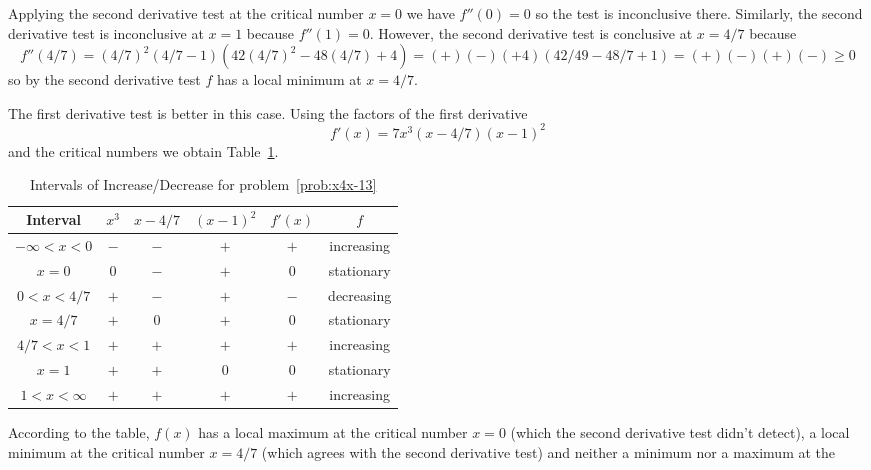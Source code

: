 \documentclass{article}
\begin{document}
\begin{enumerate}
  Applying the second derivative test at the critical number $x=0$ we
  have $f''(0)=0$ so the test is inconclusive there.  Similarly, the
  second derivative test is inconclusive at $x=1$ because $f''(1)=0$.
  However, the second derivative test is conclusive at $x=4/7$ because
  \begin{equation*}
    f''(4/7) = (4/7)^2(4/7-1) (42(4/7)^2-48(4/7)+4) = (+)(-)(+4)(42/49 - 48/7+1)
    = (+)(-)(+)(-) \ge 0
  \end{equation*}
  so by the second derivative test $f$ has a local minimum at $x=4/7$.

  The first derivative test is better in this case.  Using the factors
  of the first derivative
  \begin{equation*}
    f'(x)= 7x^3(x-4/7)(x-1)^2
  \end{equation*}
  and the critical numbers we obtain Table~\ref{tab:x4x-13fp}.
  \begin{table}[htbp]
    \centering
    \begin{tabular}{|c|c|c|c|c|c|}
      \hline
      Interval      & $x^3$ & $x-4/7$ & $(x-1)^2$ & $f'(x)$ & $f$
      \\
      \hline\hline
      $-\infty<x<0$ & $-$   & $-$     & $+$       & $+$     & increasing
      \\
      \hline
      $x=0$         & $0$   & $-$     & $+$       & $0$     & stationary
      \\
      \hline
      $0<x<4/7$     & $+$   & $-$     & $+$       & $-$     & decreasing
      \\
      \hline
      $x=4/7$       & $+$   & $0$     & $+$       & $0$     & stationary
      \\
      \hline
      $4/7<x<1$     & $+$   & $+$     & $+$       & $+$     & increasing
      \\
      \hline
      $x=1$         & $+$   & $+$     & $0$       & $0$     & stationary
      \\
      \hline
      $1<x<\infty$  & $+$   & $+$     & $+$       & $+$     & increasing
      \\
      \hline
    \end{tabular}
    \caption{Intervals of Increase/Decrease for problem~\ref{prob:x4x-13}}
    \label{tab:x4x-13fp}
  \end{table}
  According to the table, $f(x)$ has a local maximum at the critical
  number $x=0$ (which the second derivative test didn't detect), a
  local minimum at the critical number $x=4/7$ (which agrees with the
  second derivative test) and neither a minimum nor a maximum at the

\end{enumerate}
\end{document}
